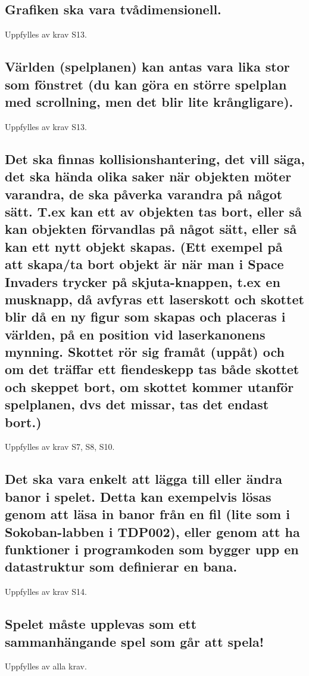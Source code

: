 \documentclass{TDP005mall}
\begin{document}
\subsection{Grafiken ska vara tvådimensionell.}
Uppfylles av krav S13.
\subsection{Världen (spelplanen) kan antas vara lika stor som fönstret (du kan göra en större spelplan med scrollning, men det blir lite krångligare).}
Uppfylles av krav S13.
\subsection{Det ska finnas kollisionshantering, det vill säga, det ska hända olika saker när objekten möter varandra, de ska påverka varandra på något sätt. T.ex kan ett av objekten tas bort, eller så kan objekten förvandlas på något sätt, eller så kan ett nytt objekt skapas. (Ett exempel på att skapa/ta bort objekt är när man i Space Invaders trycker på skjuta-knappen, t.ex en musknapp, då avfyras ett laserskott och skottet blir då en ny figur som skapas och placeras i världen, på en position vid laserkanonens mynning. Skottet rör sig framåt (uppåt) och om det träffar ett fiendeskepp tas både skottet och skeppet bort, om skottet kommer utanför spelplanen, dvs det missar, tas det endast bort.)}
Uppfylles av krav S7, S8, S10.
\subsection{Det ska vara enkelt att lägga till eller ändra banor i spelet. Detta kan exempelvis lösas genom att läsa in banor från en fil (lite som i Sokoban-labben i TDP002), eller genom att ha funktioner i programkoden som bygger upp en datastruktur som definierar en bana.}
Uppfylles av krav S14.
\subsection{Spelet måste upplevas som ett sammanhängande spel som går att spela!}
Uppfylles av alla krav.
\end{document}

